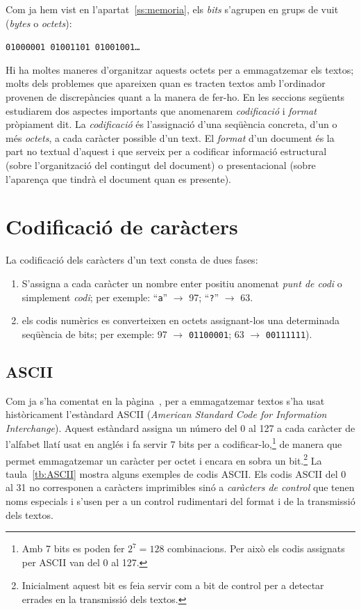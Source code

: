 Com ja hem vist en l'apartat~\ref{ss:memoria}, els \emph{bits}
s'agrupen en grups de vuit (\emph{bytes} o \emph{octets}):
\begin{center}
 \texttt{01000001 01001101 01001001\ldots}
\end{center}

Hi ha moltes maneres d'organitzar aquests octets per a emmagatzemar
els textos; molts dels problemes que apareixen quan es tracten textos
amb l'ordinador provenen de discrepàncies quant a la manera de fer-ho.
En les seccions següents estudiarem dos aspectes importants que
anomenarem \emph{codificació} i \emph{format} pròpiament dit.  La
\emph{codificació} és l'assignació d'una seqüència concreta, d'un o
més \emph{octets}, a cada caràcter possible d'un text. El
\emph{format} d'un document és la part no textual d'aquest i que
serveix per a codificar informació estructural (sobre l'organització
del contingut del document) o presentacional (sobre l'aparença que
tindrà el document quan es presente).

\section{Codificació de caràcters}
La codificació dels caràcters d'un text consta de dues fases: 
\begin{enumerate}
\item S'assigna a cada caràcter un nombre enter positiu anomenat
  \emph{punt de codi} o simplement \emph{codi}; per exemple:
  ``\texttt{a}'' $\to$ 97; ``\texttt{?}'' $\to$ 63.
\item els codis numèrics es converteixen en octets assignant-los una
  determinada seqüència de bits; per exemple: 97 $\to$
  \texttt{01100001}; 63 $\to$ \texttt{00111111}).
\end{enumerate}

\subsection{ASCII}
Com ja s'ha comentat en la pàgina~\pageref{pg:ASCII}, per a
emmagatzemar textos s'ha usat històricament l'estàndard ASCII
(\emph{American Standard Code for Information Interchange}). Aquest
estàndard assigna un número del 0 al 127 a cada caràcter de l'alfabet
llatí usat en anglés i fa servir 7 bits per a
codificar-lo,\footnote{Amb 7 bits es poden fer $2^7=128$
  combinacions. Per això els codis assignats per ASCII van del 0 al
  127.} de manera que permet emmagatzemar un caràcter per octet i
encara en sobra un bit.\footnote{Inicialment aquest bit es feia servir
  com a bit de control per a detectar errades en la transmissió dels
  textos.} La taula~\ref{tb:ASCII} mostra alguns exemples de codis
ASCII. Els codis ASCII del 0 al 31 no corresponen a caràcters
imprimibles sinó a \emph{caràcters de control} que tenen noms
especials i s'usen per a un control rudimentari del format i de la
transmissió dels textos.

